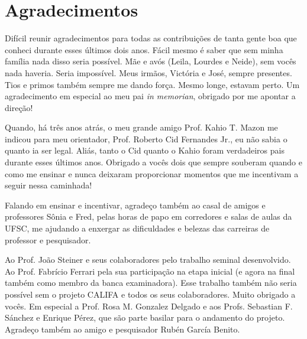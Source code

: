 

\chapter*{Agradecimentos}

Difícil reunir agradecimentos para todas as contribuições de tanta gente boa que conheci durante esses últimos dois
anos. Fácil mesmo é saber que sem minha família nada disso seria possível. Mãe e avós (Leila, Lourdes e Neide), sem
vocês nada haveria. Seria impossível. Meus irmãos, Victória e José, sempre presentes. Tios e primos também sempre me
dando força. Mesmo longe, estavam perto. Um agradecimento em especial ao meu pai {\em in memorian}, obrigado por me
apontar a direção!

Quando, há três anos atrás, o meu grande amigo Prof. Kahio T. Mazon me indicou para meu orientador, Prof. Roberto Cid
Fernandes Jr., eu não sabia o quanto ia ser legal. Aliás, tanto o Cid quanto o Kahio foram verdadeiros pais durante
esses últimos anos. Obrigado a vocês dois que sempre souberam quando e como me ensinar e nunca deixaram proporcionar
momentos que me incentivam a seguir nessa caminhada!

Falando em ensinar e incentivar, agradeço também ao casal de amigos e professores Sônia e Fred, pelas horas de papo em
corredores e salas de aulas da UFSC, me ajudando a enxergar as dificuldades e belezas das carreiras de professor e
pesquisador.

Ao Prof. João Steiner e seus colaboradores pelo trabalho seminal desenvolvido. Ao Prof. Fabrício Ferrari pela sua
participação na etapa inicial (e agora na final também como membro da banca examinadora). Esse trabalho também não seria
possível sem o projeto CALIFA e todos os seus colaboradores. Muito obrigado a vocês. Em especial a Prof. Rosa M.
Gonzalez Delgado e aos Profs. Sebastian F. Sánchez e Enrique Pérez, que são parte basilar para o andamento do projeto.
Agradeço também ao amigo e pesquisador Rubén García Benito.

